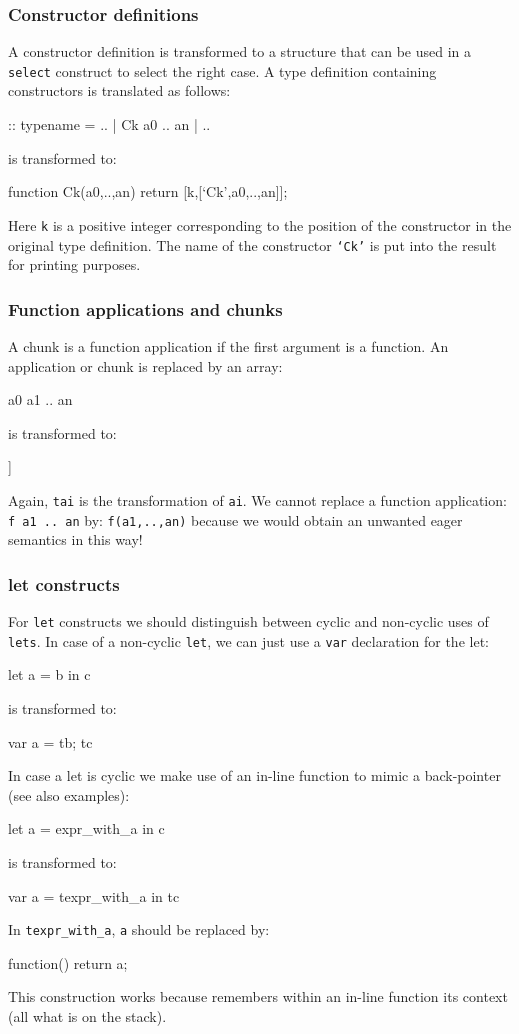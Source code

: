 \subsubsection{Constructor definitions} 
A constructor definition is transformed to a structure that can be used in a \texttt{select} construct to 
select the right case. A \Sapl type definition containing constructors is translated as follows:
\begin{CleanCode}
:: typename = .. | Ck a0 .. an | ..
\end{CleanCode}
is transformed to:
\begin{CleanCode}
function Ck(a0,..,an) {return [k,[`Ck',a0,..,an]];}
\end{CleanCode}
Here \texttt{k} is a positive integer corresponding to the position of the constructor in
the original type definition. The name of the constructor \texttt{`Ck'} is put into the result for printing purposes.


\subsubsection{Function applications and chunks} 
A chunk is a function application if the first argument is a function.
An application or chunk is replaced by an array:
\begin{CleanCode}
a0 a1 .. an 
\end{CleanCode}
is transformed to:
\begin{CleanCode}
[ta0,[ta1,..,tan]]
\end{CleanCode}
Again, \texttt{tai} is the transformation of \texttt{ai}.
We cannot replace a function application: \texttt{f a1 .. an} by: \texttt{f(a1,..,an)} because we would obtain
an unwanted  eager semantics in this way!

\subsubsection{\textsf{let} constructs} 
For \texttt{let} constructs we should distinguish between cyclic and non-cyclic uses of \texttt{lets}.
In case of a non-cyclic \texttt{let}, we can just use a \texttt{var} declaration for the let:
\begin{CleanCode}
let a = b in c
\end{CleanCode}
is transformed to:
\begin{CleanCode}
var a = tb; tc
\end{CleanCode}
In case a let is cyclic we make use of an in-line \JS function to mimic a back-pointer (see also examples):
\begin{CleanCode}
let a = expr_with_a in c
\end{CleanCode}
is transformed to:
\begin{CleanCode}
var a = texpr_with_a in tc
\end{CleanCode}
In \texttt{texpr\_with\_a}, \texttt{a} should be replaced by: 
\begin{CleanCode}
function() {return a;}
\end{CleanCode}
This construction works because \JS remembers within an in-line function its context (all what is on the stack).

